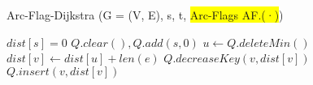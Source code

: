 \documentclass{article}
\begin{document}
\begin{algorithm}
    \captionsetup{labelformat=empty, labelsep=none}
    \caption{Arc-Flag-Dijkstra (G = (V, E), s, t, \colorbox{yellow}{Arc-Flags AF.(·)})}
    \begin{algorithmic}[1]
        \State $dist[s] = 0$
        \State $Q.clear(), Q.add(s,0)$
            \State $u \gets Q.deleteMin()$
                    \State $dist[v] \gets dist[u] + len(e)$
                     \State $Q.decreaseKey(v, dist[v])$
                    \Else{} \State $Q.insert(v, dist[v])$
                    \EndIf
                \EndIf
            \EndFor
        \EndWhile
    \end{algorithmic}
  \end{algorithm}
\end{document}
